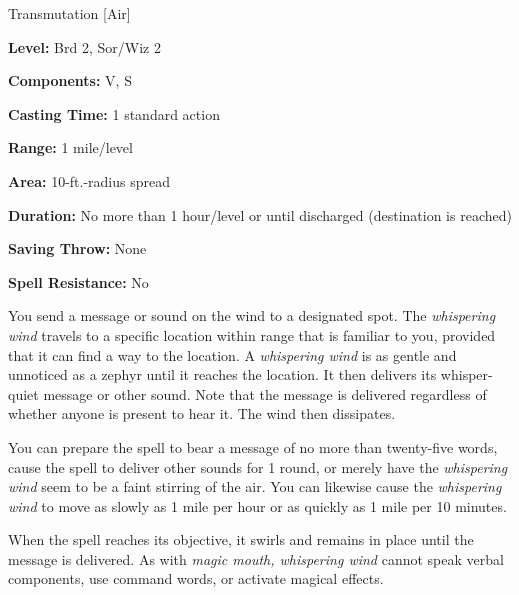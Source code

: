 
Transmutation [Air]

\textbf{Level:} Brd 2, Sor/Wiz 2

\textbf{Components:} V, S

\textbf{Casting Time:} 1 standard action

\textbf{Range:} 1 mile/level

\textbf{Area:} 10-ft.-radius spread

\textbf{Duration:} No more than 1 hour/level or until discharged (destination is 
reached)

\textbf{Saving Throw:} None

\textbf{Spell Resistance:} No

You send a message or sound on the wind to a designated spot. The \textit{whispering 
wind} travels to a specific location within range that is familiar to you, provided 
that it can find a way to the location. A \textit{whispering wind} is as gentle 
and unnoticed as a zephyr until it reaches the location. It then delivers its whisper-quiet 
message or other sound. Note that the message is delivered regardless of whether 
anyone is present to hear it. The wind then dissipates.

You can prepare the spell to bear a message of no more than twenty-five words, 
cause the spell to deliver other sounds for 1 round, or merely have the \textit{whispering 
wind} seem to be a faint stirring of the air. You can likewise cause the \textit{whispering 
wind} to move as slowly as 1 mile per hour or as quickly as 1 mile per 10 minutes.

When the spell reaches its objective, it swirls and remains in place until the 
message is delivered. As with \textit{magic mouth, whispering wind} cannot speak 
verbal components, use command words, or activate magical effects.

